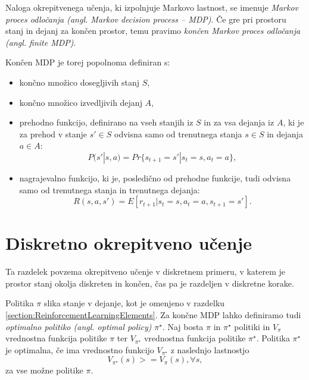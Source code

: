 \documentclass[a4paper, oneside, 12pt]{report}
\begin{document}
Naloga okrepitvenega učenja, ki izpolnjuje Markovo lastnost, se imenuje {\em Markov proces odločanja (angl. Markov decision process -- MDP)}. Če gre pri prostoru stanj in dejanj za končen prostor, temu pravimo {\em končen Markov proces odločanja (angl. finite MDP)}.

Končen MDP je torej popolnoma definiran s:
\begin{itemize}
\item končno množico dosegljivih stanj $S$,
\item končno množico izvedljivih dejanj $A$,
\item prehodno funkcijo, definirano na vseh stanjih iz $S$ in za vsa dejanja iz $A$, ki je za prehod v stanje $s' \in S$ odvisna samo od trenutnega stanja $s \in S$ in dejanja $a \in A$: 
\begin{equation}
P(s' | s, a) = Pr\{s_{t+1} = s' | s_t = s, a_t = a\},
\end{equation}
\item nagrajevalno funkcijo, ki je, posledično od prehodne funkcije, tudi odvisna samo od trenutnega stanja in trenutnega dejanja:
\begin{equation}
R(s, a, s') = E[r_{t+1} | s_t = s, a_t = a, s_{t+1} = s'].
\end{equation}
\end{itemize}

\section{Diskretno okrepitveno učenje}
Ta razdelek povzema okrepitveno učenje v diskretnem primeru, v katerem je prostor stanj okolja diskreten in končen, čas pa je razdeljen v diskretne korake.

Politika $\pi$ slika stanje v dejanje, kot je omenjeno v razdelku \ref{section:ReinforcementLearningElements}. Za končne MDP lahko definiramo tudi {\em optimalno politiko (angl. optimal policy)} $\pi^\star$. Naj bosta $\pi$ in $\pi^\star$ politiki in $V_\pi$ vrednostna funkcija politike $\pi$ ter $V_{\pi^\star}$ vrednostna funkcija politike $\pi^\star$. Politika $\pi^\star$ je optimalna, če ima vrednostno funkcijo  $V_{\pi^\star}$ z naslednjo lastnostjo
\begin{equation}
V_{\pi^\star}(s) >= V_\pi(s), \forall s,
\end{equation}
za vse možne politike $\pi$.
\end{document}
